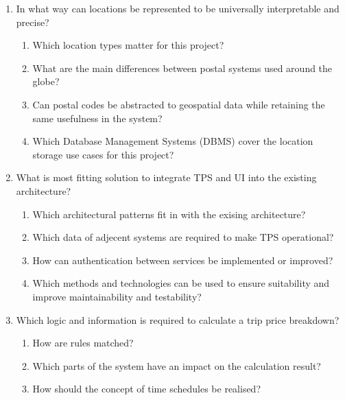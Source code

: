 \begin{enumerate}

	\item In what way can locations be represented to be universally interpretable and precise?
		\begin{enumerate}[label*=\arabic*.]
			\item Which location types matter for this project?
			\item What are the main differences between postal systems used around the globe?
			\item Can postal codes be abstracted to geospatial data while retaining the same usefulness in the system?
			\item Which Database Management Systems (DBMS) cover the location storage use cases for this project?
		\end{enumerate}

	\item What is most fitting solution to integrate TPS and UI into the existing architecture?
		\begin{enumerate}[label*=\arabic*.]
			\item Which architectural patterns fit in with the exising architecture?
			\item Which data of adjecent systems are required to make TPS operational?
			\item How can authentication between services be implemented or improved?
			\item Which methods and technologies can be used to ensure suitability and improve maintainability and testability?
		\end{enumerate}

	\item Which logic and information is required to calculate a trip price breakdown?
		\begin{enumerate}[label*=\arabic*.]
			\item How are rules matched?
			\item Which parts of the system have an impact on the calculation result?
			\item How should the concept of time schedules be realised?
		\end{enumerate}


\end{enumerate}
